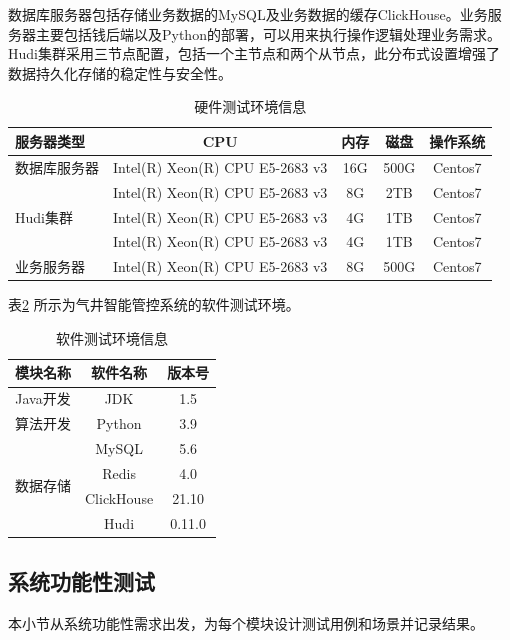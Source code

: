 数据库服务器包括存储业务数据的MySQL及业务数据的缓存ClickHouse。业务服务器主要包括钱后端以及Python的部署，可以用来执行操作逻辑处理业务需求。Hudi集群采用三节点配置，包括一个主节点和两个从节点，此分布式设置增强了数据持久化存储的稳定性与安全性。
\begin{table}
    \renewcommand{\arraystretch}{1.5}
    \centering
    \caption{硬件测试环境信息}
    \label{tab:systesthaen}
    \begin{tabular}{|l|c|c|c|c|} %
        \hline
        \textbf{服务器类型} & \textbf{CPU}& \textbf{内存} & \textbf{磁盘} & \textbf{操作系统} \\ 
        \hline
        数据库服务器    & Intel(R) Xeon(R) CPU E5-2683 v3 & 16G       & 500G      & Centos7    \\ 
        \hline
        \multirow{3}{*}{Hudi集群} & Intel(R) Xeon(R) CPU E5-2683 v3 & 8G        & 2TB       & Centos7   \\ 
        \cline{2-5} & Intel(R) Xeon(R) CPU E5-2683 v3 & 4G        & 1TB       & Centos7  \\
        \cline{2-5} & Intel(R) Xeon(R) CPU E5-2683 v3 & 4G        & 1TB       & Centos7  \\ 
        \hline
        业务服务器      & Intel(R) Xeon(R) CPU E5-2683 v3 & 8G        & 500G      & Centos7   \\ 
        \hline
    \end{tabular}
\end{table}
表\ref{tab:systestsoen}
所示为气井智能管控系统的软件测试环境。
\begin{table}
    \renewcommand{\arraystretch}{1.5}
    \centering
    \caption{软件测试环境信息}
    \label{tab:systestsoen}
    \begin{tabular}{|c|c|c|}
        \hline
        模块名称 & 软件名称 & 版本号 \\ 
        \hline
        Java开发 & JDK &1.5 \\
        \hline
        算法开发 & Python & 3.9 \\
        \hline 
        \multirow{4}{*}{数据存储} & MySQL & 5.6 \\
        \cline{2-3} & Redis &4.0 \\
        \cline{2-3} & ClickHouse & 21.10 \\
        \cline{2-3} & Hudi & 0.11.0 \\
        \hline
    \end{tabular}
\end{table}
\subsection{系统功能性测试}
本小节从系统功能性需求出发，为每个模块设计测试用例和场景并记录结果。

